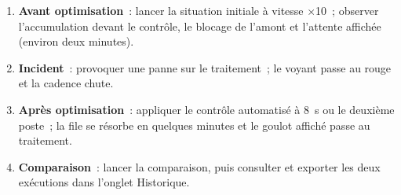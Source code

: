\begin{enumerate}
  \item \textbf{Avant optimisation}~: lancer la situation initiale à vitesse $\times$10~; observer l'accumulation devant le contrôle, le blocage de l'amont et l'attente affichée (environ deux minutes).
  \item \textbf{Incident}~: provoquer une panne sur le traitement~; le voyant passe au rouge et la cadence chute.
  \item \textbf{Après optimisation}~: appliquer le contrôle automatisé à 8~s ou le deuxième poste~; la file se résorbe en quelques minutes et le goulot affiché passe au traitement.
  \item \textbf{Comparaison}~: lancer la comparaison, puis consulter et exporter les deux exécutions dans l'onglet Historique.
\end{enumerate}
